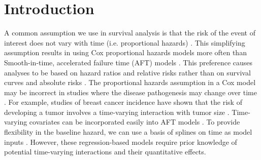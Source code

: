 \documentclass[APA,LATO1COL]{WileyNJD-v2}
\begin{document}



\maketitle




\hypertarget{introduction}{%
\section{Introduction}\label{introduction}}





A common assumption we use in survival analysis is that the risk of the event of interest does not vary with
time (i.e. proportional hazards) \citep{hanley2009}. This simplifying assumption results in using Cox proportional
hazards models more often than Smooth-in-time, accelerated failure time (AFT) models \citep{hanley2009}. This
preference causes analyses to be based on hazard ratios and relative risks rather than on survival curves and
absolute risks \citep{hanley2009}. The proportional hazards assumption in a Cox model may be incorrect in studies
where the disease pathogenesis may change over time \citep{coradini2000time}. For example, studies of breast cancer
incidence have shown that the risk of developing a tumor involves a time-varying interaction with tumor size
\citep{coradini2000time}. Time-varying covariates can be incorporated easily into AFT models \citep{royston2002flexible}.
To provide flexibility in the baseline hazard, we can use a basis of splines on time as model inputs
\citep{royston2002flexible}. However, these regression-based models require prior knowledge of potential
time-varying interactions and their quantitative effects.
\end{document}
